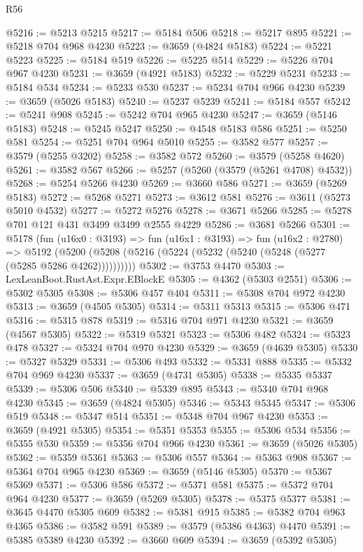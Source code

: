 \begin{lexlean}{R56}
\begin{coremodule}
@5216 := @5213 @5215
@5217 := @5184 @506
@5218 := @5217 @895
@5221 := @5218 @704 @968 @4230
@5223 := @3659 (@4824 @5183)
@5224 := @5221 @5223
@5225 := @5184 @519
@5226 := @5225 @514
@5229 := @5226 @704 @967 @4230
@5231 := @3659 (@4921 @5183)
@5232 := @5229 @5231
@5233 := @5184 @534
@5234 := @5233 @530
@5237 := @5234 @704 @966 @4230
@5239 := @3659 (@5026 @5183)
@5240 := @5237 @5239
@5241 := @5184 @557
@5242 := @5241 @908
@5245 := @5242 @704 @965 @4230
@5247 := @3659 (@5146 @5183)
@5248 := @5245 @5247
@5250 := @4548 @5183 @586
@5251 := @5250 @581
@5254 := @5251 @704 @964 @5010
@5255 := @3582 @577
@5257 := @3579 (@5255 @3202)
@5258 := @3582 @572
@5260 := @3579 (@5258 @4620)
@5261 := @3582 @567
@5266 := @5257 (@5260 (@3579 (@5261 @4708) @4532))
@5268 := @5254 @5266 @4230
@5269 := @3660 @586
@5271 := @3659 (@5269 @5183)
@5272 := @5268 @5271
@5273 := @3612 @581
@5276 := @3611 (@5273 @5010 @4532)
@5277 := @5272 @5276
@5278 := @3671 @5266
@5285 := @5278 @701 @121 @431 @3499 @3499 @2555 @4229
@5286 := @3681 @5266
@5301 := @5178
    (fun (u16x0 : @3193) =>
    fun (u16x1 : @3193) =>
    fun (u16x2 : @2780) =>
    @5192 (@5200 (@5208 (@5216 (@5224 (@5232 (@5240 (@5248 (@5277 (@5285 @5286 @4262))))))))))
@5302 := @3753 @4470
@5303 := LexLeanBoot.RustAst.Expr.EBlockE
@5305 := @4362 (@5303 @2551)
@5306 := @5302 @5305
@5308 := @5306 @457 @404
@5311 := @5308 @704 @972 @4230
@5313 := @3659 (@4505 @5305)
@5314 := @5311 @5313
@5315 := @5306 @471
@5316 := @5315 @878
@5319 := @5316 @704 @971 @4230
@5321 := @3659 (@4567 @5305)
@5322 := @5319 @5321
@5323 := @5306 @482
@5324 := @5323 @478
@5327 := @5324 @704 @970 @4230
@5329 := @3659 (@4639 @5305)
@5330 := @5327 @5329
@5331 := @5306 @493
@5332 := @5331 @888
@5335 := @5332 @704 @969 @4230
@5337 := @3659 (@4731 @5305)
@5338 := @5335 @5337
@5339 := @5306 @506
@5340 := @5339 @895
@5343 := @5340 @704 @968 @4230
@5345 := @3659 (@4824 @5305)
@5346 := @5343 @5345
@5347 := @5306 @519
@5348 := @5347 @514
@5351 := @5348 @704 @967 @4230
@5353 := @3659 (@4921 @5305)
@5354 := @5351 @5353
@5355 := @5306 @534
@5356 := @5355 @530
@5359 := @5356 @704 @966 @4230
@5361 := @3659 (@5026 @5305)
@5362 := @5359 @5361
@5363 := @5306 @557
@5364 := @5363 @908
@5367 := @5364 @704 @965 @4230
@5369 := @3659 (@5146 @5305)
@5370 := @5367 @5369
@5371 := @5306 @586
@5372 := @5371 @581
@5375 := @5372 @704 @964 @4230
@5377 := @3659 (@5269 @5305)
@5378 := @5375 @5377
@5381 := @3645 @4470 @5305 @609
@5382 := @5381 @915
@5385 := @5382 @704 @963 @4365
@5386 := @3582 @591
@5389 := @3579 (@5386 @4363) @4470
@5391 := @5385 @5389 @4230
@5392 := @3660 @609
@5394 := @3659 (@5392 @5305)

\end{coremodule}
\end{lexlean}

